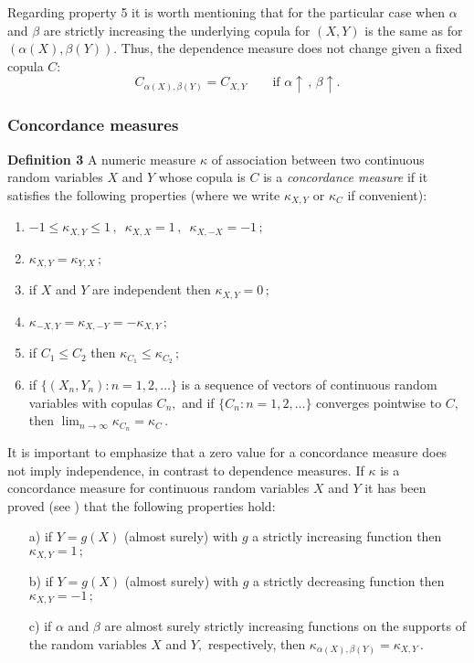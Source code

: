 \documentclass[journal]{vgtc}                %
\begin{document}
Regarding property 5 it is worth mentioning that for the particular case when $\alpha$ and $\beta$ are strictly increasing the underlying copula for $(X,Y)$ is the same as for $(\alpha(X), \beta(Y))$. Thus, the dependence measure does not change given a fixed copula $C$:
\begin{equation}\label{eq:scaleCopula}
    C_{\alpha(X),\beta(Y)} = C_{X,Y} \qquad \mbox{if}\,\,\alpha\uparrow\,,\,\beta\uparrow .
\end{equation}


\subsubsection{Concordance measures}

\textbf{Definition 3} \cite{Scarsini1984} A numeric measure $\kappa$ of association between two continuous random variables $X$ and $Y$ whose copula is $C$ is a \textit{concordance measure} if it satisfies the following properties (where we write $\kappa_{X,Y}$ or $\kappa_C$ if convenient):
\begin{enumerate}
    \item $-1\leq\kappa_{X,Y}\leq 1\,,\,$ $\kappa_{X,X}=1\,,\,$ $\kappa_{X,-X}=-1\,;$
    \item $\kappa_{X,Y}=\kappa_{Y,X}\,;$
    \item if $X$ and $Y$ are independent then $\kappa_{X,Y} = 0\,;$
    \item $\kappa_{-X,Y}=\kappa_{X,-Y}=-\kappa_{X,Y}\,;$
    \item if $C_1\leq C_2$ then $\kappa_{C_1}\leq\kappa_{C_2}\,;$
    \item if $\{(X_n,Y_n): n = 1,2,\ldots\}$ is a sequence of vectors of continuous random variables with copulas $C_n,$ and if $\{C_n:n=1,2,\ldots\}$ converges pointwise to $C,$ then $\lim_{n\rightarrow\infty}\kappa_{C_n}=\kappa_C\,.$
\end{enumerate}

It is important to emphasize that a zero value for a concordance measure does not imply independence, in contrast to dependence measures. If $\kappa$ is a concordance measure for continuous random variables $X$ and $Y$ it has been proved (see \cite{Nelsen1999}) that the following properties hold:
\begin{itemize}
    \item[a)] if $Y=g(X)$ (almost surely) with $g$ a strictly increasing function then $\kappa_{X,Y}=1\,;$
    \item[b)] if $Y=g(X)$ (almost surely) with $g$ a strictly decreasing function then $\kappa_{X,Y}=-1\,;$
    \item[c)] if $\alpha$ and $\beta$ are almost surely strictly increasing functions on the supports of the random variables $X$ and $Y,$ respectively, then $\kappa_{\alpha(X),\beta(Y)}=\kappa_{X,Y}\,.$
\end{itemize}
\end{document}
